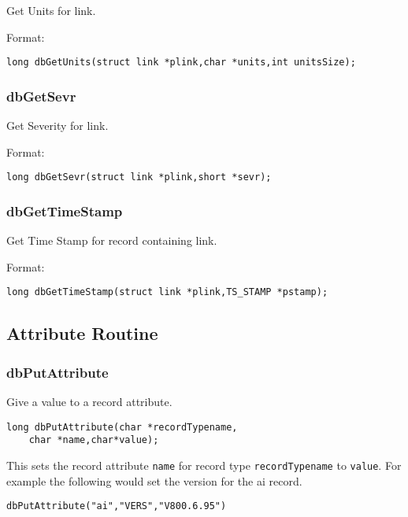 Get Units for link.

Format:

\begin{verbatim}
long dbGetUnits(struct link *plink,char *units,int unitsSize);
\end{verbatim}

\subsubsection{dbGetSevr}

Get Severity for link.

Format:

\begin{verbatim}
long dbGetSevr(struct link *plink,short *sevr);
\end{verbatim}

\subsubsection{dbGetTimeStamp}

Get Time Stamp for record containing link.

Format:

\begin{verbatim}
long dbGetTimeStamp(struct link *plink,TS_STAMP *pstamp);
\end{verbatim}

\subsection{Attribute Routine}

\subsubsection{dbPutAttribute}

Give a value to a record attribute.

\begin{verbatim}
long dbPutAttribute(char *recordTypename,
    char *name,char*value);
\end{verbatim}

This sets the record attribute \verb|name| for record type \verb|recordTypename| to \verb|value|.
For example the following would set the version for the ai record.

\begin{verbatim}
dbPutAttribute("ai","VERS","V800.6.95")
\end{verbatim}

